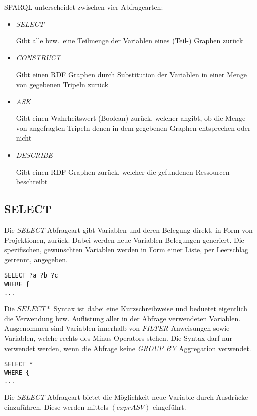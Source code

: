 SPARQL unterscheidet zwischen vier Abfragearten:
\begin{itemize}
    \item \textit{SELECT}

        Gibt alle bzw.\ eine Teilmenge der Variablen eines (Teil-) Graphen zurück
    \item \textit{CONSTRUCT}

        Gibt einen RDF Graphen durch Substitution der Variablen in einer Menge von gegebenen Tripeln zurück
    \item \textit{ASK}

        Gibt einen Wahrheitswert (Boolean) zurück, welcher angibt, ob die Menge von angefragten Tripeln denen in dem gegebenen Graphen entsprechen oder nicht
    \item \textit{DESCRIBE}

        Gibt einen RDF Graphen zurück, welcher die gefundenen Ressourcen beschreibt
\end{itemize}

\subsection{SELECT}
\label{subsec:sparql_abfragearten_select}
Die \textit{SELECT}-Abfrageart gibt Variablen und deren Belegung direkt, in Form von Projektionen, zurück. Dabei werden neue Variablen-Belegungen generiert. Die spezifischen, gewünschten Variablen werden in Form einer Liste, per Leerschlag getrennt, angegeben.

\begin{lstlisting}
SELECT ?a ?b ?c
WHERE {
...
\end{lstlisting}

Die $ SELECT * $ Syntax ist dabei eine Kurzschreibweise und beduetet eigentlich die Verwendung bzw. Auflistung aller in der Abfrage verwendeten Variablen. Ausgenommen sind Variablen innerhalb von \textit{FILTER}-Anweisungen sowie Variablen, welche rechts des Minus-Operators stehen. Die Syntax darf nur verwendet werden, wenn die Abfrage keine \textit{GROUP BY} Aggregation verwendet.
\begin{lstlisting}
SELECT *
WHERE {
...
\end{lstlisting}

Die \textit{SELECT}-Abfrageart bietet die Möglichkeit neue Variable durch Ausdrücke einzuführen. Diese werden mittels $(expr AS V)$ eingeführt.

